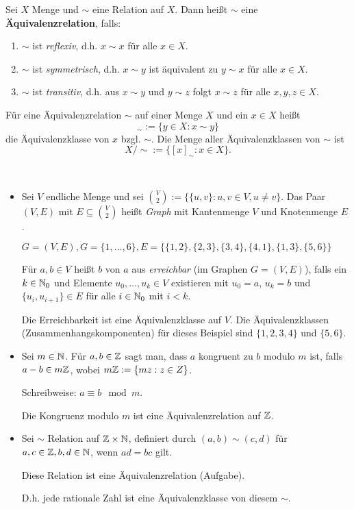 \begin{defn}
Sei $ X $ Menge und $ \sim $ eine Relation auf $ X $. Dann heißt $ \sim $ eine \textbf{Äquivalenzrelation}, falls:
\begin{enumerate}
	\item $ \sim $ ist \emph{reflexiv}, d.h. $ x \sim x $ für alle $ x \in X $.
	\item $ \sim $ ist \emph{symmetrisch}, d.h. $ x \sim y $ ist äquivalent zu $ y \sim x $ für alle $ x \in X $.
	\item $ \sim $ ist \emph{transitiv}, d.h. aus $ x \sim y $ und $ y \sim z $ folgt $ x \sim z $ für alle $ x,y,z \in X $.
\end{enumerate}
Für eine Äquivalenzrelation $ \sim $ auf einer Menge $ X $ und ein $ x \in X $ heißt
\begin{equation*}
	[x]_\sim := \{ y \in X : x \sim y \}
\end{equation*}
die Äquivalenzklasse von $ x $ bzgl. $ \sim $. Die Menge aller Äquivalenzklassen von $ \sim $ ist
\begin{equation*}
	X/{\sim} := \{ [x]_\sim : x \in X \}. %
\end{equation*}
\end{defn} 

\begin{bsp}\
\begin{itemize}
	\item Sei $ V $ endliche Menge und sei $ \binom{V}{2} := \{ \{ u,v \} : u,v \in V, u \neq v \} $. Das Paar $ (V,E) $ mit $ E \subseteq \binom{V}{2} $ heißt \emph{Graph} mit Kantenmenge $ V $ und Knotenmenge $ E $.
	
	$ G = (V,E), G = \{ 1,\ldots,6 \}, E = \{ \{ 1,2 \}, \{ 2,3 \}, \{ 3,4 \}, \{ 4,1 \}, \{ 1,3 \}, \{ 5,6 \} \} $
	
	Für $ a,b \in V $ heißt $ b $ von $ a $ aus \emph{erreichbar} (im Graphen $ G = (V,E) $), falls ein $ k \in \mathbb{N}_0 $ und Elemente $ u_0,\ldots,u_k \in V $ existieren mit $ u_0 = a $, $ u_k = b $ und $ \{ u_i,u_{i+1} \} \in E $ für alle $ i \in \mathbb{N}_0 $ mit $ i < k $.
	
	Die Erreichbarkeit ist eine Äquivalenzklasse auf $ V $.	Die Äquivalenzklassen (Zusammenhangskomponenten) für dieses Beispiel sind $ \{ 1,2,3,4 \} $ und $ \{ 5,6 \} $.
	
	\item Sei $ m \in \mathbb{N} $. Für $ a,b \in \mathbb{Z} $ sagt man, dass $ a $ kongruent zu $ b $ modulo $ m $ ist, falls $ a-b \in m\mathbb{Z} $, wobei $ m\mathbb{Z} := \{ mz : z \in Z \} $.
	
	Schreibweise: $ a \equiv b \mod{m} $.
	
	Die Kongruenz modulo $ m $ ist eine Äquivalenzrelation auf $ \mathbb{Z} $.
	
	\item Sei $ \sim $ Relation auf $ \mathbb{Z} \times \mathbb{N} $, definiert durch $ (a,b) \sim (c,d) $ für $ a,c \in \mathbb{Z}, b,d \in \mathbb{N} $, wenn $ ad = bc $ gilt.
	
	Diese Relation ist eine Äquivalenzrelation (Aufgabe).
	
	D.h. jede rationale Zahl ist eine Äquivalenzklasse von diesem $ \sim $.
\end{itemize}
\end{bsp}


